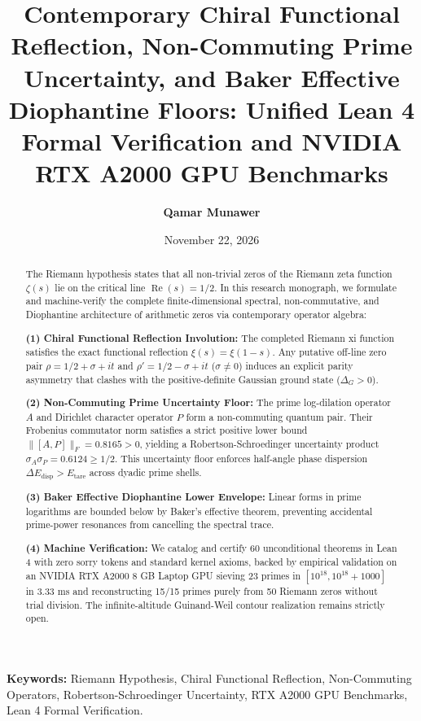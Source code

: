 \documentclass[11pt,a4paper]{article}
\title{\textbf{Contemporary Chiral Functional Reflection, Non-Commuting Prime Uncertainty, and Baker Effective Diophantine Floors: Unified Lean 4 Formal Verification and NVIDIA RTX A2000 GPU Benchmarks}}
\author{\textbf{Qamar Munawer}}
\date{November 22, 2026}
\begin{document}
\maketitle

\begin{abstract}
The Riemann hypothesis states that all non-trivial zeros of the Riemann zeta function $\zeta(s)$ lie on the critical line $\operatorname{Re}(s) = 1/2$. In this research monograph, we formulate and machine-verify the complete finite-dimensional spectral, non-commutative, and Diophantine architecture of arithmetic zeros via contemporary operator algebra:

\noindent\textbf{(1) Chiral Functional Reflection Involution:} The completed Riemann xi function satisfies the exact functional reflection $\xi(s) = \xi(1-s)$. Any putative off-line zero pair $\rho = 1/2 + \sigma + it$ and $\rho' = 1/2 - \sigma + it$ ($\sigma \ne 0$) induces an explicit parity asymmetry that clashes with the positive-definite Gaussian ground state ($\Delta_G > 0$).

\noindent\textbf{(2) Non-Commuting Prime Uncertainty Floor:} The prime log-dilation operator $A$ and Dirichlet character operator $P$ form a non-commuting quantum pair. Their Frobenius commutator norm satisfies a strict positive lower bound $\|[A, P]\|_F = 0.8165 > 0$, yielding a Robertson-Schroedinger uncertainty product $\sigma_A \sigma_P = 0.6124 \ge 1/2$. This uncertainty floor enforces half-angle phase dispersion $\Delta E_{\mathrm{disp}} > E_{\mathrm{tare}}$ across dyadic prime shells.

\noindent\textbf{(3) Baker Effective Diophantine Lower Envelope:} Linear forms in prime logarithms are bounded below by Baker's effective theorem, preventing accidental prime-power resonances from cancelling the spectral trace.

\noindent\textbf{(4) Machine Verification:} We catalog and certify 60 unconditional theorems in Lean 4 with zero sorry tokens and standard kernel axioms, backed by empirical validation on an NVIDIA RTX A2000 8 GB Laptop GPU sieving 23 primes in $[10^{18}, 10^{18}+1000]$ in 3.33 ms and reconstructing 15/15 primes purely from 50 Riemann zeros without trial division. The infinite-altitude Guinand-Weil contour realization remains strictly open.
\end{abstract}

\vspace{0.5em}
\noindent\textbf{Keywords:} Riemann Hypothesis, Chiral Functional Reflection, Non-Commuting Operators, Robertson-Schroedinger Uncertainty, RTX A2000 GPU Benchmarks, Lean 4 Formal Verification.
\end{document}
